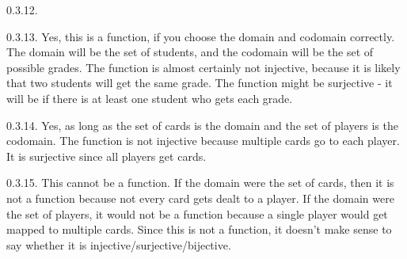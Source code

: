 \begin {itemize}
\begin{ans}{0.3.12.}
\begin{parts}
		\end{parts}
	
\end{ans}
\begin{ans}{0.3.13.}
	   Yes, this is a function, if you choose the domain and codomain correctly.  The domain will be the set of students, and the codomain will be the set of possible grades.  The function is almost certainly not injective, because it is likely that two students will get the same grade.  The function might be surjective - it will be if there is at least one student who gets each grade.
	
\end{ans}
\begin{ans}{0.3.14.}
		Yes, as long as the set of cards is the domain and the set of players is the codomain.  The function is not injective because multiple cards go to each player.  It is surjective since all players get cards.
	
\end{ans}
\begin{ans}{0.3.15.}
	  This cannot be a function.  If the domain were the set of cards, then it is not a function because not every card gets dealt to a player.  If the domain were the set of players, it would not be a function because a single player would get mapped to multiple cards.  Since this is not a function, it doesn't make sense to say whether it is injective/surjective/bijective.
	
\end{ans}
\protect \end {itemize}
